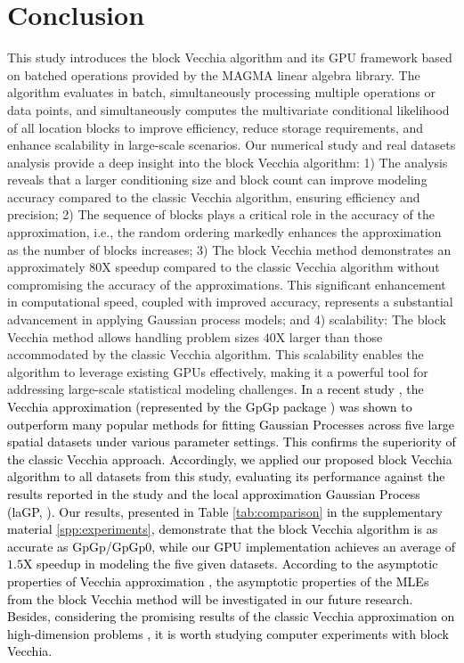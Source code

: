 \documentclass[12pt]{article}
\begin{document}
\section{Conclusion}
\label{sec:conclusion}

This study introduces the block Vecchia algorithm and its GPU framework based on batched operations provided by the MAGMA linear algebra library. The algorithm evaluates in batch, simultaneously processing multiple operations or data points, and simultaneously computes the multivariate conditional likelihood of all location blocks to improve efficiency, reduce storage requirements, and enhance scalability in large-scale scenarios. Our numerical study and real datasets analysis provide a deep insight into the block Vecchia algorithm: 1) The analysis reveals that a larger conditioning size and block count can improve modeling accuracy compared to the classic Vecchia algorithm, ensuring efficiency and precision; 2) The sequence of blocks plays a critical role in the accuracy of the approximation, i.e., the random ordering markedly enhances the approximation as the number of blocks increases; 3) The block Vecchia method demonstrates an approximately $80$X speedup compared to the classic Vecchia algorithm without compromising the accuracy of the approximations. This significant enhancement in computational speed, coupled with improved accuracy, represents a substantial advancement in applying Gaussian process models; and 4) scalability: The block Vecchia method allows handling problem sizes $40$X larger than those accommodated by the classic Vecchia algorithm. This scalability enables the algorithm to leverage existing GPUs effectively, making it a powerful tool for addressing large-scale statistical modeling challenges. \textcolor{black}{In a recent study \citep{hazra2024exploring}, the Vecchia approximation (represented by the GpGp package \citep{guinness2021gpgp}) was shown to outperform many popular methods for fitting Gaussian Processes across five large spatial datasets under various parameter settings. This confirms the superiority of the classic Vecchia approach. Accordingly, we applied our proposed block Vecchia algorithm to all datasets from this study, evaluating its performance against the results reported in the study and the local approximation Gaussian Process (laGP, \citep{gramacy2016lagp}). Our results, presented in Table \ref{tab:comparison} in the supplementary material \ref{spp:experiments}, demonstrate that the block Vecchia algorithm is as accurate as GpGp/GpGp0,
while our GPU implementation achieves an average of  $1.5$X speedup in modeling the five given datasets.  
}
\textcolor{black}{According to the asymptotic properties of Vecchia approximation \citep{kang2024asymptotic, zhang2021fixed}, the asymptotic properties of the MLEs from the block Vecchia method will be investigated in our future research. Besides, considering the promising results of the classic Vecchia approximation on high-dimension problems \citep{katzfuss2022scaled, jimenez2023scalable}, it is worth studying computer experiments with block Vecchia.}
\end{document}
